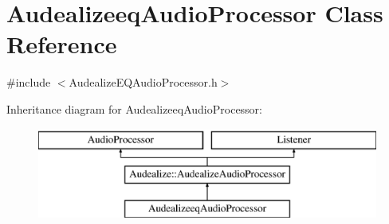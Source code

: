 \hypertarget{class_audealizeeq_audio_processor}{}\section{Audealizeeq\+Audio\+Processor Class Reference}
\label{class_audealizeeq_audio_processor}


{\ttfamily \#include $<$Audealize\+E\+Q\+Audio\+Processor.\+h$>$}

Inheritance diagram for Audealizeeq\+Audio\+Processor\+:\begin{figure}[H]
\begin{center}
\leavevmode
\includegraphics[height=3.000000cm]{class_audealizeeq_audio_processor}
\end{center}
\end{figure}
